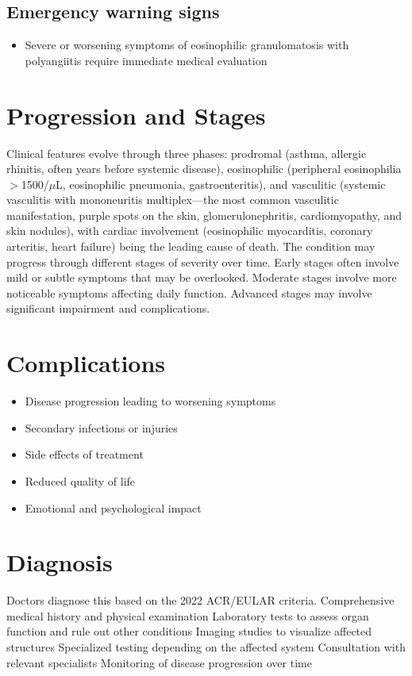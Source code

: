 \subsection{Emergency warning signs}
\begin{itemize}[noitemsep]
  \item Severe or worsening symptoms of eosinophilic granulomatosis with polyangiitis require immediate medical evaluation
\end{itemize}
\section{Progression and Stages}
Clinical features evolve through three phases: prodromal (asthma, allergic rhinitis, often years before systemic disease), eosinophilic (peripheral eosinophilia $>$1500/$\mu$L, eosinophilic pneumonia, gastroenteritis), and vasculitic (systemic vasculitis with mononeuritis multiplex---the most common vasculitic manifestation, purple spots on the skin, glomerulonephritis, cardiomyopathy, and skin nodules), with cardiac involvement (eosinophilic myocarditis, coronary arteritis, heart failure) being the leading cause of death. The condition may progress through different stages of severity over time. Early stages often involve mild or subtle symptoms that may be overlooked. Moderate stages involve more noticeable symptoms affecting daily function. Advanced stages may involve significant impairment and complications.
\section{Complications}
\begin{itemize}[noitemsep]
  \item Disease progression leading to worsening symptoms
  \item Secondary infections or injuries
  \item Side effects of treatment
  \item Reduced quality of life
  \item Emotional and psychological impact
\end{itemize}
\section{Diagnosis}
Doctors diagnose this based on the 2022 ACR/EULAR criteria. Comprehensive medical history and physical examination Laboratory tests to assess organ function and rule out other conditions Imaging studies to visualize affected structures Specialized testing depending on the affected system Consultation with relevant specialists Monitoring of disease progression over time

